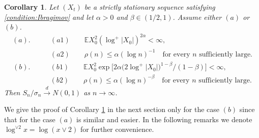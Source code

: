 \documentclass[11pt,a4,leqno]{amsart}
\newtheorem{corollary}[lemma]{Corollary}
\newcommand{\E }{{\mathbb E}}
\newcommand{\1}{{\mathbf 1}}
\begin{document}
\begin{corollary}
\label{cor:clt:log:mixing}
Let $(X_t)$ be a strictly stationary sequence satisfying \eqref{condition:Ibragimov} and let $\alpha>0$ and $\beta\in (1/2,1)$.
Assume either $(a)$ or $(b)$. 
\begin{align*}
(a). \qquad & (a1)\qquad \E X_0^2 (\log^+ |X_0|)^{2\alpha} <\infty, \\
           & (a2)\qquad \rho(n) \le \alpha(\log n)^{-1}\quad \text{for every $n$ sufficiently large}.
\end{align*}
\begin{align*}
(b). \qquad & (b1) \qquad  \E X_0^2 \exp\Big[
2\alpha \big(2\log^+ |X_0|\big)^{1-\beta}/(1-\beta)
\Big] <\infty, \\
& (b2) \qquad  \rho(n) \le \alpha(\log n)^{-\beta}\quad \text{for every $n$ sufficiently large}.
\end{align*}
Then $S_n/\sigma_n\stackrel{d}{\to} N(0,1)$ as $n\to\infty$. 
\end{corollary}

We give the proof of Corollary \ref{cor:clt:log:mixing} in the next section only for the case $(b)$ since that 
for the case $(a)$ is similar and easier. In the following remarks we denote $\log^{\vee 2}x = \log (x\vee 2)$ for further convenience. 
\end{document}
